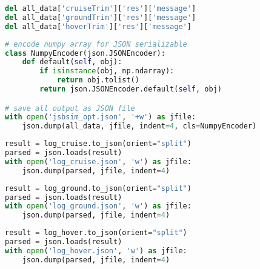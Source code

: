 \begin{lstlisting}[language=Python]
del all_data['cruiseTrim']['res']['message']
del all_data['groundTrim']['res']['message']
del all_data['hoverTrim']['res']['message']
\end{lstlisting}

\begin{lstlisting}[language=Python]
# encode numpy array for JSON serializable
class NumpyEncoder(json.JSONEncoder):
    def default(self, obj):
        if isinstance(obj, np.ndarray):
            return obj.tolist()
        return json.JSONEncoder.default(self, obj)

# save all output as JSON file 
with open('jsbsim_opt.json', '+w') as jfile:
    json.dump(all_data, jfile, indent=4, cls=NumpyEncoder)
\end{lstlisting}

\begin{lstlisting}[language=Python]
result = log_cruise.to_json(orient="split")
parsed = json.loads(result)
with open('log_cruise.json', 'w') as jfile: 
    json.dump(parsed, jfile, indent=4)
\end{lstlisting}

\begin{lstlisting}[language=Python]
result = log_ground.to_json(orient="split")
parsed = json.loads(result)
with open('log_ground.json', 'w') as jfile: 
    json.dump(parsed, jfile, indent=4)
\end{lstlisting}

\begin{lstlisting}[language=Python]
result = log_hover.to_json(orient="split")
parsed = json.loads(result)
with open('log_hover.json', 'w') as jfile: 
    json.dump(parsed, jfile, indent=4)
\end{lstlisting}
